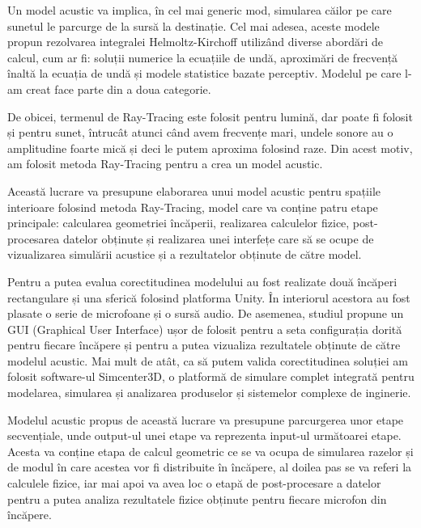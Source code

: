 Un model acustic va implica, în cel mai generic mod, simularea căilor pe care sunetul le parcurge de la sursă la destinație. Cel mai adesea, aceste modele propun rezolvarea integralei Helmoltz-Kirchoff \cite{kirchoff} utilizând diverse abordări de calcul, cum ar fi: soluții numerice la ecuațiile de undă, aproximări de frecvență înaltă la ecuația de undă și modele statistice bazate perceptiv. Modelul pe care l-am creat face parte din a doua categorie.

De obicei, termenul de Ray-Tracing este folosit pentru lumină, dar poate fi folosit și pentru sunet, întrucât atunci când avem frecvențe mari, undele sonore au o amplitudine foarte mică și deci le putem aproxima folosind raze. Din acest motiv, am folosit metoda Ray-Tracing pentru a crea un model acustic.

Această lucrare va presupune elaborarea unui model acustic pentru spațiile interioare folosind metoda Ray-Tracing, model care va conține patru etape principale: calcularea geometriei încăperii, realizarea calculelor fizice, post-procesarea datelor obținute și realizarea unei interfețe care să se ocupe de vizualizarea simulării acustice și a rezultatelor obținute de către model.

Pentru a putea evalua corectitudinea modelului au fost realizate două încăperi rectangulare și una sferică folosind platforma Unity. În interiorul acestora au fost plasate o serie de microfoane și o sursă audio. De asemenea, studiul propune un GUI (Graphical User Interface) ușor de folosit pentru a seta configurația dorită pentru fiecare încăpere și pentru a putea vizualiza rezultatele obținute de către modelul acustic. Mai mult de atât, ca să putem valida corectitudinea soluției am folosit software-ul Simcenter3D, o platformă de simulare complet integrată pentru modelarea, simularea și analizarea produselor și sistemelor complexe de inginerie.

Modelul acustic propus de această lucrare va presupune parcurgerea unor etape secven\-țiale, unde output-ul unei etape va reprezenta input-ul următoarei etape. Acesta va conține etapa de calcul geometric ce se va ocupa de simularea razelor și de modul în care acestea vor fi distribuite în încăpere, al doilea pas se va referi la calculele fizice, iar mai apoi va avea loc o etapă de post-procesare a datelor pentru a putea analiza rezultatele fizice obținute pentru fiecare microfon din încăpere.

